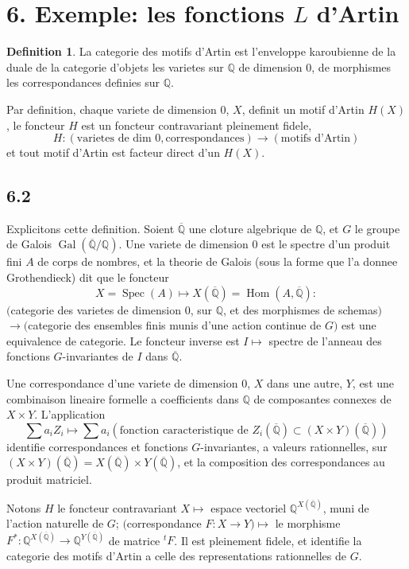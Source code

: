\documentclass[12pt,a4paper]{article}
\theoremstyle{plain}
\theoremstyle{definition}
\newtheorem{definition}{Definition}[section]
\theoremstyle{remark}
\DeclareMathOperator{\Hom}{Hom}
\DeclareMathOperator{\Gal}{Gal}
\DeclareMathOperator{\Spec}{Spec}
\newcommand{\Q}{\mathbb{Q}}
\begin{document}
\section*{6. Exemple: les fonctions $L$ d'Artin}

\begin{definition}\label{def:6.1}
La categorie des motifs d'Artin est l'enveloppe karoubienne de la duale de la
categorie d'objets les varietes sur $\Q$ de dimension 0, de morphismes les
correspondances definies sur $\Q$.
\end{definition}

Par definition, chaque variete de dimension 0, $X$, definit un motif d'Artin
$H(X)$, le foncteur $H$ est un foncteur contravariant pleinement fidele,
\[
H: (\text{varietes de dim } 0, \text{correspondances}) \to (\text{motifs d'Artin})
\]
et tout motif d'Artin est facteur direct d'un $H(X)$.

\subsection*{6.2}

Explicitons cette definition. Soient $\overline{\Q}$ une cloture algebrique de $\Q$, et $G$ le
groupe de Galois $\Gal(\overline{\Q}/\Q)$. Une variete de dimension 0 est le spectre d'un produit
fini $A$ de corps de nombres, et la theorie de Galois (sous la forme que l'a donnee
Grothendieck) dit que le foncteur
\[
X = \Spec(A) \mapsto X(\overline{\Q}) = \Hom(A, \overline{\Q}):
\]
$($categorie des varietes de dimension 0, sur $\Q$, et des morphismes de schemas$)$
$\to ($categorie des ensembles finis munis d'une action continue de $G)$
est une equivalence de categorie. Le foncteur inverse est $I \mapsto$ spectre de l'anneau
des fonctions $G$-invariantes de $I$ dans $\overline{\Q}$.

Une correspondance d'une variete de dimension 0, $X$ dans une autre, $Y$, est une
combinaison lineaire formelle a coefficients dans $\Q$ de composantes connexes de
$X \times Y$. L'application
\[
\sum a_i Z_i \mapsto \sum a_i (\text{fonction caracteristique de } Z_i(\overline{\Q}) \subset (X \times Y)(\overline{\Q}))
\]
identifie correspondances et fonctions $G$-invariantes, a valeurs rationnelles, sur
$(X \times Y)(\overline{\Q}) = X(\overline{\Q}) \times Y(\overline{\Q})$, et la composition des correspondances au produit
matriciel.

Notons $H$ le foncteur contravariant $X \mapsto$ espace vectoriel $\Q^{X(\overline{\Q})}$, muni de l'action
naturelle de $G$; $($correspondance $F: X \to Y) \mapsto$ le morphisme
$F^*: \Q^{X(\overline{\Q})} \to \Q^{Y(\overline{\Q})}$ de matrice $^tF$. Il est pleinement fidele, et identifie la categorie
des motifs d'Artin a celle des representations rationnelles de $G$.
\end{document}
